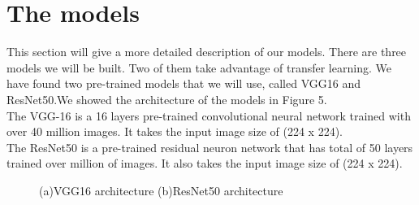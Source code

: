 \documentclass{article}
\begin{document}
\section{The models}
\label{others}
This section will give a more detailed description of our models. There are three models we will be built. Two of them take advantage of transfer learning. We have found two pre-trained models that we will use, called VGG16\cite{simonyan2014very} and ResNet50\citep{he2016deep}.We showed the architecture of the models in Figure 5.\\
The VGG-16\cite{simonyan2014very} is a 16 layers pre-trained convolutional neural network trained with over 40 million images. It takes the input image size of (224 x 224). \\
The ResNet50\citep{he2016deep} is a pre-trained residual neuron network that has total of 50 layers trained over million of images. It also takes the input image size of (224 x 224).

\begin{figure}[H]
    \centering

    \caption{(a)VGG16 architecture (b)ResNet50 architecture}
    \label{fig:foobar}
\end{figure}
\end{document}
